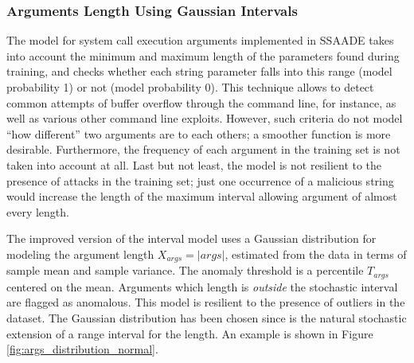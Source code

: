 \subsubsection{Arguments Length Using Gaussian Intervals}
\label{host:improving:exec-models}
The model for system call execution arguments implemented in \ac{SSAADE} takes into account the minimum and maximum length of the parameters found during training, and checks whether each string parameter falls into this range (model probability 1) or not (model probability 0). This technique allows to detect common attempts of buffer overflow through the command line, for instance, as well as various other command line exploits. However, such criteria do not model ``how different'' two arguments are to each others; a smoother function is more desirable. Furthermore, the frequency of each argument in the training set is not taken into account at all. Last but not least, the model is not resilient to the presence of attacks in the training set; just one occurrence of a malicious string would increase the length of the maximum interval allowing argument of almost every length.

The improved version of the interval model uses a Gaussian distribution for modeling the argument length $X_{args} = |args|$, estimated from the data in terms of sample mean and sample variance. The anomaly threshold is a percentile $T_{args}$ centered on the mean. Arguments which length is \emph{outside} the stochastic interval are flagged as anomalous. This model is resilient to the presence of outliers in the dataset. The Gaussian distribution has been chosen since is the natural stochastic extension of a range interval for the length. An example is shown in Figure \ref{fig:args_distribution_normal}.

